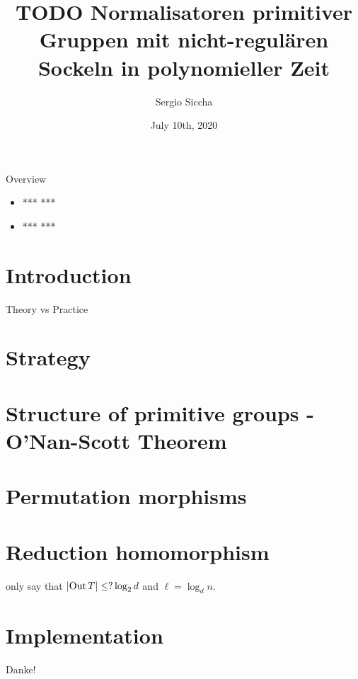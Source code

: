 \documentclass{beamer}
\title{TODO Normalisatoren primitiver Gruppen mit nicht-regulären
Sockeln in polynomieller Zeit}
\date{July 10th, 2020}
\author{Sergio Siccha}
\theoremstyle{plain}
\theoremstyle{definition}
\newcommand{\TODO}[1]{{\color{red}*** #1 ***}}
\begin{document}
\maketitle
{}

\begin{frame}{Overview}
\begin{itemize}
\setlength{\itemsep}{\fill}
\item \TODO{}
\item \TODO{}
\end{itemize}
\end{frame}

\section{Introduction}

\begin{frame}{Theory vs Practice}

\end{frame}

\section{Strategy}

\section{Structure of primitive groups - O'Nan-Scott Theorem}

\section{Permutation morphisms}

\section{Reduction homomorphism}
\begin{frame}
only say that
$ \left| \operatorname{Out} T \right|  \leq ? \log_2 d$
and
$\ell = \log_d n$.
\end{frame}

\section{Implementation}
\begin{frame}[standout]
Danke!
\end{frame}
\end{document}
